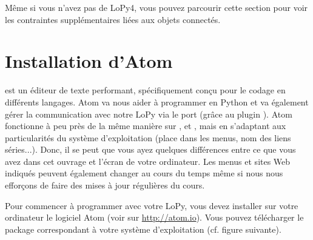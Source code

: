      \vspace{1em}


Même si vous n’avez pas de LoPy4, vous pouvez parcourir cette section pour voir les contraintes supplémentaires liées aux objets connectés.

\section{Installation d'Atom}

 est un éditeur de texte performant, spécifiquement conçu pour le codage en différents langages. 
Atom va nous aider à programmer en Python et va également gérer la communication avec notre LoPy via le port  (grâce au plugin ). 
Atom fonctionne à peu près de la même manière sur ,  et , mais en s’adaptant aux particularités du système d’exploitation (place dans les menus, nom des liens séries...). 
Donc, il se peut que vous ayez quelques différences entre ce que vous avez dans cet ouvrage et l’écran de votre ordinateur. 
Les menus et sites Web indiqués peuvent également changer au cours du temps même si nous nous efforçons de faire des mises à jour régulières du cours.


     \vspace{1em}

Pour commencer à programmer avec votre LoPy, vous devez installer sur votre ordinateur le logiciel Atom (voir sur \url{http://atom.io}). 
Vous pouvez télécharger le package correspondant à votre système d'exploitation (cf. figure suivante).

